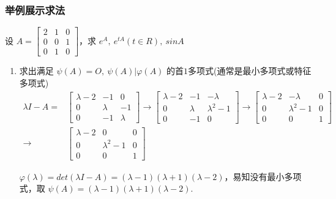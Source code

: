         \subsubsection{举例展示求法}
            \begin{problem}
                \par 设 $A = \begin{bmatrix}
                    2 & 1 & 0 \\ 0 & 0 & 1 \\ 0 & 1 & 0
                \end{bmatrix}$，求 $e^A, \ e^{tA}(t \in R), \ sinA$ 
            \end{problem}
            \begin{solution}
                \begin{enumerate}
                    \item 求出满足 $\psi(A) = O, \ \psi(A) | \varphi(A)$ 的首$1$多项式(通常是最小多项式或特征多项式)
                        \begin{align*}
                            \lambda I - A = &\begin{bmatrix}
                                \lambda - 2 & -1 & 0 \\ 0 & \lambda & -1 \\ 0 & -1 & \lambda
                            \end{bmatrix} \rightarrow \begin{bmatrix}
                                \lambda - 2 & -1 & -\lambda \\ 0 & \lambda & \lambda^2 - 1 \\ 0 & -1 & 0
                            \end{bmatrix} \rightarrow \begin{bmatrix}
                                \lambda - 2 & -\lambda & 0 \\ 0 & \lambda^2 - 1 & 0 \\ 0 & 0 & 1 
                            \end{bmatrix} \\ \rightarrow &\begin{bmatrix}
                                \lambda - 2 & 0 & 0 \\ 0 & \lambda^2 - 1 & 0 \\ 0 & 0 & 1 
                            \end{bmatrix}
                        \end{align*}
                        \par $\varphi(\lambda) = det(\lambda I - A) = (\lambda - 1)(\lambda + 1)(\lambda - 2)$，易知没有最小多项式，取 $\psi(A) = (\lambda-1)(\lambda + 1)(\lambda - 2)$.

\end{enumerate}
\end{solution}
